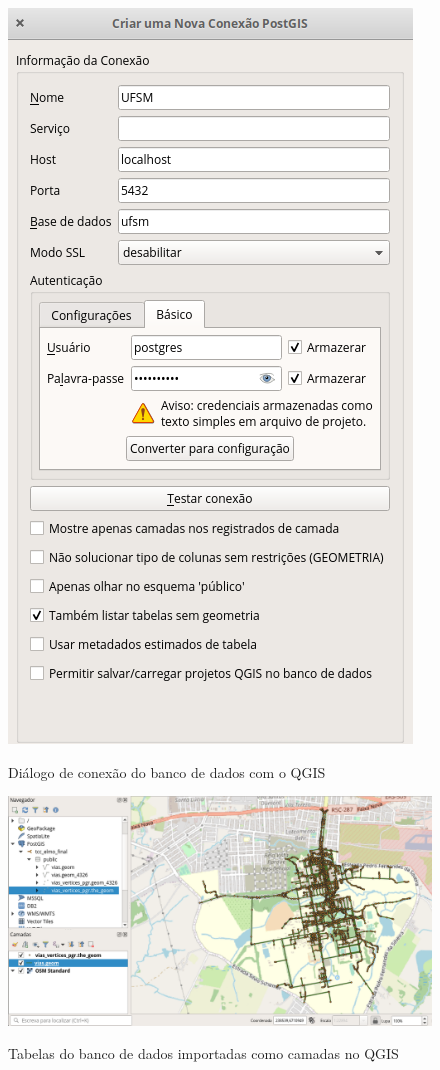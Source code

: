 \documentclass[oneside,openright,12pt]{ufsm_2015} %
\begin{document}
\begin{figure}[h!]
    \caption{Diálogo de conexão do banco de dados com o QGIS}
    \centering
    \includegraphics[scale=0.3]{imagens/dialogo_conexao_banco_qgis.png}
    \label{dialogo_conexao_banco_qgis}
\end{figure}

\begin{figure}[h!]
    \caption{Tabelas do banco de dados importadas como camadas no QGIS}
    \centering
    \includegraphics[scale=0.4]{imagens/camadas_banco_qgis.png}
    \label{camadas_banco_qgis}
\end{figure}
\end{document}
